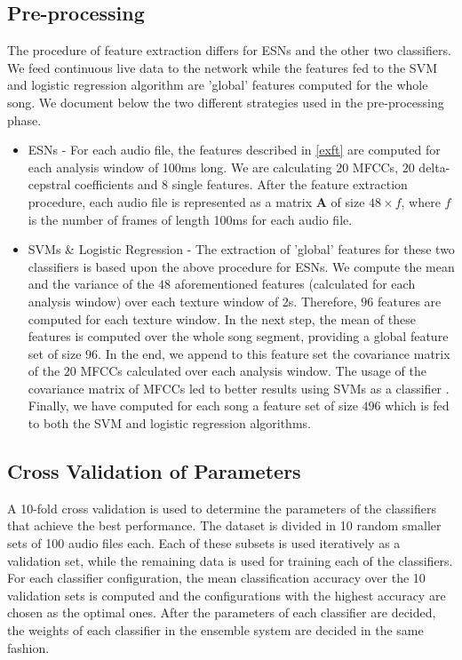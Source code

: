 \documentclass[a4paper,11pt,oneside]{article}
\begin{document}
\subsection{Pre-processing}
The procedure of feature extraction differs for ESNs and the other two classifiers.
We feed continuous live data to the network while the features fed to the SVM and logistic regression
algorithm are 'global' features computed for the whole song. We document below the two different strategies
used in the pre-processing phase.
\begin{itemize}
  \item ESNs - For each audio file, the features described in \ref{exft} are computed for 
  each analysis window of 100ms long. We are calculating $20$ MFCCs, $20$ delta-cepstral
  coefficients and $8$ single features. After the feature extraction procedure, each audio file
  is represented as a matrix $\mathbf{A}$ of size $48\times f$, where $f$ is the number of frames
  of length 100ms for each audio file. 
  \item SVMs \& Logistic Regression - The extraction of 'global' features for these two classifiers 
  is based upon the above procedure for ESNs. We compute the mean and the variance of the $48$
  aforementioned features (calculated for each analysis window) over each texture window of 2s.
  Therefore, $96$ features are computed for each texture window. In the next step, the mean of these
  features is computed over the whole song segment, providing a global feature set of size $96$.
  In the end, we append to this feature set the covariance matrix of the $20$ MFCCs
  calculated over each analysis window. The usage of the covariance matrix of MFCCs led to better results
  using SVMs as a classifier \cite{ellis}. Finally, we have computed for each song a feature set of size $496$ which
  is fed to both the SVM and logistic regression algorithms.
\end{itemize}
\subsection{Cross Validation of Parameters}
A 10-fold cross validation is used to determine the parameters of the classifiers 
that achieve the best performance. The dataset is divided in 10 random smaller sets of 
100 audio files each. Each of these subsets is used iteratively as a validation set, while
the remaining data is used for training each of the classifiers. For each classifier configuration,
the mean classification accuracy over the 10 validation sets is computed and the configurations with 
the highest accuracy are chosen as the optimal ones. After the parameters of each classifier are 
decided, the weights of each classifier in the ensemble system are decided in the same fashion.
\end{document}
